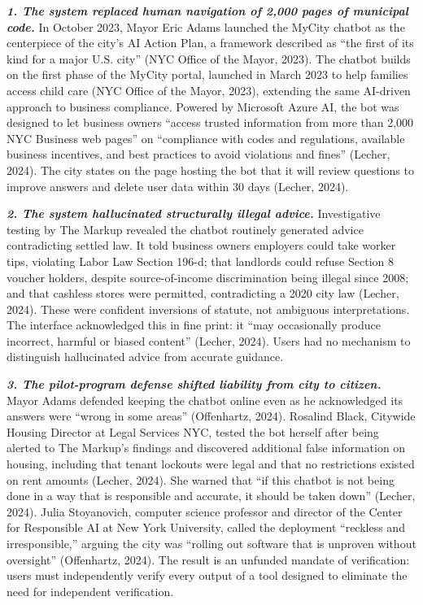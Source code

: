 \documentclass[11pt, twocolumn]{article}
\begin{document}
\textbf{\textit{1. The system replaced human navigation of 2,000 pages of municipal code.}}
In October 2023, Mayor Eric Adams launched the MyCity chatbot as the centerpiece of the city's AI Action Plan, a framework described as ``the first of its kind for a major U.S. city'' (NYC Office of the Mayor, 2023). The chatbot builds on the first phase of the MyCity portal, launched in March 2023 to help families access child care (NYC Office of the Mayor, 2023), extending the same AI-driven approach to business compliance. Powered by Microsoft Azure AI, the bot was designed to let business owners ``access trusted information from more than 2,000 NYC Business web pages'' on ``compliance with codes and regulations, available business incentives, and best practices to avoid violations and fines'' (Lecher, 2024). The city states on the page hosting the bot that it will review questions to improve answers and delete user data within 30 days (Lecher, 2024).

\textbf{\textit{2. The system hallucinated structurally illegal advice.}}
Investigative testing by The Markup revealed the chatbot routinely generated advice contradicting settled law. It told business owners employers could take worker tips, violating Labor Law Section 196-d; that landlords could refuse Section 8 voucher holders, despite source-of-income discrimination being illegal since 2008; and that cashless stores were permitted, contradicting a 2020 city law (Lecher, 2024). These were confident inversions of statute, not ambiguous interpretations. The interface acknowledged this in fine print: it ``may occasionally produce incorrect, harmful or biased content'' (Lecher, 2024). Users had no mechanism to distinguish hallucinated advice from accurate guidance.

\textbf{\textit{3. The pilot-program defense shifted liability from city to citizen.}}
Mayor Adams defended keeping the chatbot online even as he acknowledged its answers were ``wrong in some areas'' (Offenhartz, 2024). Rosalind Black, Citywide Housing Director at Legal Services NYC, tested the bot herself after being alerted to The Markup's findings and discovered additional false information on housing, including that tenant lockouts were legal and that no restrictions existed on rent amounts (Lecher, 2024). She warned that ``if this chatbot is not being done in a way that is responsible and accurate, it should be taken down'' (Lecher, 2024). Julia Stoyanovich, computer science professor and director of the Center for Responsible AI at New York University, called the deployment ``reckless and irresponsible,'' arguing the city was ``rolling out software that is unproven without oversight'' (Offenhartz, 2024). The result is an unfunded mandate of verification: users must independently verify every output of a tool designed to eliminate the need for independent verification.
\end{document}

